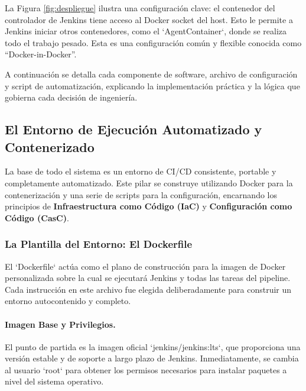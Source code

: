 La Figura \ref{fig:despliegue} ilustra una configuración clave: el contenedor del controlador de Jenkins tiene acceso al Docker socket del host. Esto le permite a Jenkins iniciar otros contenedores, como el `AgentContainer`, donde se realiza todo el trabajo pesado. Esta es una configuración común y flexible conocida como ``Docker-in-Docker''.

A continuación se detalla cada componente de software, archivo de configuración y script de automatización, explicando la implementación práctica y la lógica que gobierna cada decisión de ingeniería.

\subsection{El Entorno de Ejecución Automatizado y Contenerizado}
\label{subsec:entorno_automatizado}

La base de todo el sistema es un entorno de CI/CD consistente, portable y completamente automatizado. Este pilar se construye utilizando Docker para la contenerización y una serie de scripts para la configuración, encarnando los principios de \textbf{Infraestructura como Código (IaC)} y \textbf{Configuración como Código (CasC)}.

\subsubsection{La Plantilla del Entorno: El Dockerfile}
\label{subsubsec:dockerfile_exhaustivo}

El `Dockerfile` actúa como el plano de construcción para la imagen de Docker personalizada sobre la cual se ejecutará Jenkins y todas las tareas del pipeline. Cada instrucción en este archivo fue elegida deliberadamente para construir un entorno autocontenido y completo.

\paragraph{Imagen Base y Privilegios.}
El punto de partida es la imagen oficial `jenkins/jenkins:lts`, que proporciona una versión estable y de soporte a largo plazo de Jenkins. Inmediatamente, se cambia al usuario `root` para obtener los permisos necesarios para instalar paquetes a nivel del sistema operativo.

